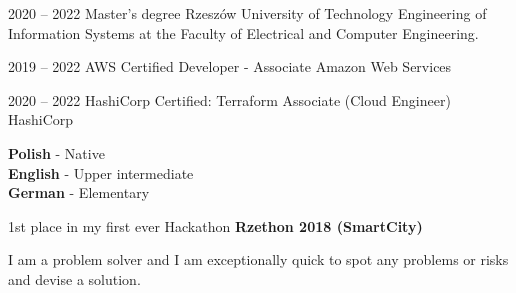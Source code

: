 \documentclass[9pt]{developercv} %
\begin{document}
\begin{entrylist}
	\entry
	{2020 -- 2022}
	{Master's degree}
	{Rzeszów University of Technology}
	{Engineering of Information Systems at the Faculty of Electrical and Computer Engineering.}
\end{entrylist}



\begin{entrylist}
	\certs
	{2019 -- 2022}
	{AWS Certified Developer - Associate}
	{Amazon Web Services}
\end{entrylist}

\begin{entrylist}
	\certs
	{2020 -- 2022}
	{HashiCorp Certified: Terraform Associate (Cloud Engineer)}
	{HashiCorp}
\end{entrylist}

\vspace{0.5cm}


\begin{minipage}[t]{0.3\textwidth}
	\vspace{-\baselineskip} %
	
		
	\textbf{Polish} - Native\\
	\textbf{English} - 	Upper intermediate\\
	\textbf{German} - Elementary
\end{minipage}
\hfill
\begin{minipage}[t]{0.3\textwidth}
	\vspace{-\baselineskip} %
		
		
	1st place in my first ever Hackathon \textbf{Rzethon 2018 (SmartCity)}
\end{minipage}
\hfill
\begin{minipage}[t]{0.3\textwidth}
	\vspace{-\baselineskip} %
		
		
	I am a problem solver and I am exceptionally quick to spot any problems or risks and devise a solution.
\end{minipage}


\end{document}
